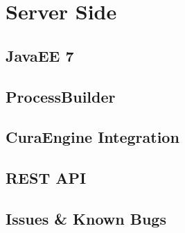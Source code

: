 \chapter{Server Side}

\section{JavaEE 7}
\section{ProcessBuilder}
\section{CuraEngine Integration}
\section{REST API}
\section{Issues \& Known Bugs}


